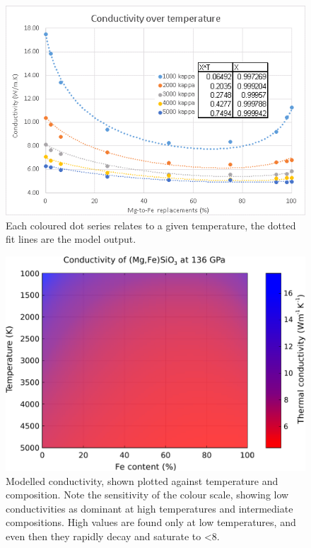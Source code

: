\begin{figure}[h]
  \includegraphics[width=\linewidth]{Figures/draft_kC.png}
  \caption{Each coloured dot series relates to a given temperature, the dotted fit lines are the model output.}
  \label{fig:draft_kc}
\end{figure}

\begin{figure}[h]
  \includegraphics[width=\linewidth]{Figures/K_over_T_over_X.png}
  \caption{Modelled conductivity, shown plotted against temperature and composition. Note the sensitivity of the colour scale, showing low conductivities as dominant at high temperatures and intermediate compositions. High values are found only at low temperatures, and even then they rapidly decay and saturate to <8\wmk.}
  \label{fig:draft_ktc}
\end{figure}




